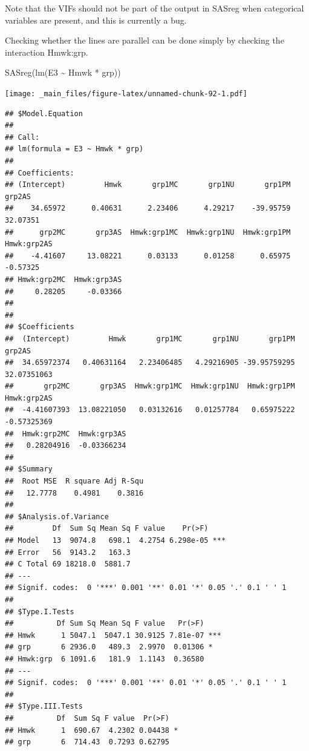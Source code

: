 \documentclass[
]{book}
\newenvironment{Shaded}{\begin{snugshade}}{\end{snugshade}}
\newcommand{\FunctionTok}[1]{\textcolor[rgb]{0.00,0.00,0.00}{#1}}
\newcommand{\NormalTok}[1]{#1}
\newcommand{\SpecialCharTok}[1]{\textcolor[rgb]{0.00,0.00,0.00}{#1}}
\begin{document}
Note that the VIFs should not be part of the output in SASreg when categorical variables are present, and this is currently a bug.

Checking whether the lines are parallel can be done simply by checking the interaction Hmwk:grp.

\begin{Shaded}
\begin{Highlighting}[]
\FunctionTok{SASreg}\NormalTok{(}\FunctionTok{lm}\NormalTok{(E3 }\SpecialCharTok{\textasciitilde{}}\NormalTok{ Hmwk }\SpecialCharTok{*}\NormalTok{ grp))}
\end{Highlighting}
\end{Shaded}

\texttt{[image: \_main\_files/figure-latex/unnamed-chunk-92-1.pdf]}

\begin{verbatim}
## $Model.Equation
## 
## Call:
## lm(formula = E3 ~ Hmwk * grp)
## 
## Coefficients:
## (Intercept)         Hmwk       grp1MC       grp1NU       grp1PM       grp2AS  
##    34.65972      0.40631      2.23406      4.29217    -39.95759     32.07351  
##      grp2MC       grp3AS  Hmwk:grp1MC  Hmwk:grp1NU  Hmwk:grp1PM  Hmwk:grp2AS  
##    -4.41607     13.08221      0.03133      0.01258      0.65975     -0.57325  
## Hmwk:grp2MC  Hmwk:grp3AS  
##     0.28205     -0.03366  
## 
## 
## $Coefficients
##  (Intercept)         Hmwk       grp1MC       grp1NU       grp1PM       grp2AS 
##  34.65972374   0.40631164   2.23406485   4.29216905 -39.95759295  32.07351063 
##       grp2MC       grp3AS  Hmwk:grp1MC  Hmwk:grp1NU  Hmwk:grp1PM  Hmwk:grp2AS 
##  -4.41607393  13.08221050   0.03132616   0.01257784   0.65975222  -0.57325369 
##  Hmwk:grp2MC  Hmwk:grp3AS 
##   0.28204916  -0.03366234 
## 
## $Summary
##  Root MSE  R square Adj R-Squ 
##   12.7778    0.4981    0.3816 
## 
## $Analysis.of.Variance
##         Df  Sum Sq Mean Sq F value    Pr(>F)    
## Model   13  9074.8   698.1  4.2754 6.298e-05 ***
## Error   56  9143.2   163.3                      
## C Total 69 18218.0  5881.7                      
## ---
## Signif. codes:  0 '***' 0.001 '**' 0.01 '*' 0.05 '.' 0.1 ' ' 1
## 
## $Type.I.Tests
##          Df Sum Sq Mean Sq F value   Pr(>F)    
## Hmwk      1 5047.1  5047.1 30.9125 7.81e-07 ***
## grp       6 2936.0   489.3  2.9970  0.01306 *  
## Hmwk:grp  6 1091.6   181.9  1.1143  0.36580    
## ---
## Signif. codes:  0 '***' 0.001 '**' 0.01 '*' 0.05 '.' 0.1 ' ' 1
## 
## $Type.III.Tests
##          Df  Sum Sq F value  Pr(>F)  
## Hmwk      1  690.67  4.2302 0.04438 *
## grp       6  714.43  0.7293 0.62795  

\end{verbatim}
\end{document}
